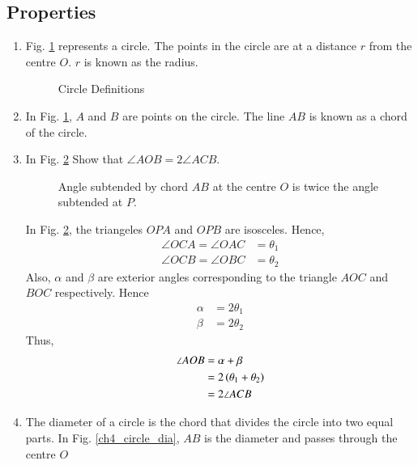\subsection{Properties}
%
\renewcommand{\theequation}{\theenumi}
\begin{enumerate}[label=\arabic*.,ref=\thesubsection.\theenumi]
%
\item
	Fig. \ref{ch4_circle_def} represents a circle.  The points in the circle are at a distance $r$ from the centre $O$.  $r$ is known as the radius.

\begin{figure}[!ht]
	\begin{center}
		
		\resizebox{\columnwidth}{!}{}
	\end{center}
	\caption{Circle Definitions}
	\label{ch4_circle_def}	
\end{figure}
\item
	In Fig. \ref{ch4_circle_def}, $A$ and $B$ are points on the circle.  The line $AB$ is known as a chord of the circle.

%
%
\item
	\label{ch4_prob_circle_subtend}
	In Fig. \ref{ch4_circle_subtend}  Show that $\angle AOB = 2\angle ACB $.

\begin{figure}[!ht]
	\begin{center}
		
		\resizebox{\columnwidth}{!}{}
	\end{center}
	\caption{Angle subtended by chord $AB$ at the centre $O$ is twice the angle subtended at $P$. }
	\label{ch4_circle_subtend}	
\end{figure}

\solution In Fig. \ref{ch4_circle_subtend}, the triangeles $OPA$ and $OPB$ are isosceles. Hence,
%
\begin{align}
\angle OCA = \angle OAC &= \theta_1 \\
\angle OCB = \angle OBC &= \theta_2
\end{align}
%
Also, $\alpha$ and $\beta$ are exterior angles corresponding to the triangle $AOC$ and $BOC$ respectively. Hence
%
\begin{align}
\alpha &= 2\theta_1 \\
\beta &= 2\theta_2
\end{align}
%
Thus,
%
\begin{align}
\angle AOB &= \alpha + \beta \\
&= 2\left(\theta_1 + \theta_2\right) \\
&= 2\angle ACB
\end{align}
%
\item
	The diameter of a circle is the chord that divides the circle into two equal parts. In Fig. \ref{ch4_circle_dia}, $AB$ is the diameter and passes through the centre $O$


\end{enumerate}
